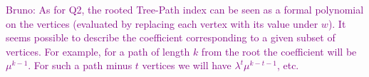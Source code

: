 \documentclass[11 pt]{modarticle}
\newcommand{\wmap}{w}
\newcommand{\bldcomment}[1]{\textcolor{purple}{{\footnotesize Bruno:} #1}}
\begin{document}
\bldcomment{As for Q2, the rooted Tree-Path index can be seen as a formal polynomial on the vertices (evaluated by replacing each vertex with its value under $\wmap$). It seems possible to describe the coefficient corresponding to a given subset of vertices. For example, for a path of length $k$ from the root the coefficient will be $\mu^{k-1}$. For such a path minus $t$ vertices we will have $\lambda^t\mu^{k-t-1}$, etc.}

\pagebreak
{}





\pagebreak
\appendix
\end{document}
